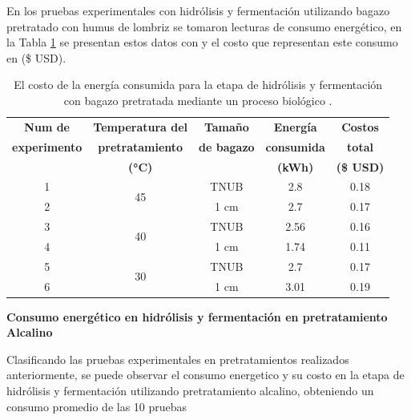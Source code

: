 \documentclass[12pt]{article}
\begin{document}
	En los pruebas experimentales con hidrólisis y fermentación utilizando bagazo pretratado con humus de lombriz se tomaron lecturas de consumo energético, en la Tabla \ref{pruebbio} se presentan estos datos con y el costo que representan este consumo en (\$ USD).
	

	\begin{table}[H]
	\centering
	\caption{El costo de la energía consumida para la etapa de hidrólisis y fermentación con bagazo pretratada mediante un proceso biológico . }
	\label{pruebbio}
	{\fontsize{9}{10.8}\selectfont %
		\begin{tabular}{|c|c|c|c|c|}
			\hline
			\textbf{Num de}&\textbf{Temperatura del} & \textbf{Tamaño } & \textbf{Energía } & \textbf{Costos } \\ 
		\textbf{experimento}&\textbf{pretratamiento} &	\textbf{ de bagazo}   & 	\textbf{consumida  }& 	\textbf{ total} \\ 
		&	\textbf{(°C)}  &    & \textbf{(kWh)} & \textbf{(\$ USD)} \\ \hline
	1	&	\multirow{2}{*}{45}& TNUB & 2.8 & 0.18 \\  \cline{3-5} \cline{1-1}
	2	&	& 1 cm & 2.7 & 0.17  \\ \hline 
	3	&	\multirow{2}{*}{40} & TNUB & 2.56 & 0.16  \\ \cline{3-5}\cline{1-1}
	4	&	& 1 cm & 1.74 & 0.11  \\ \hline
	5	&	\multirow{2}{*}{30}	& TNUB & 2.7 & 0.17  \\ \cline{3-5}\cline{1-1}
	6	&	& 1 cm & 3.01 & 0.19  \\ \hline
			
		\end{tabular}
	}
\end{table}




	
		\textbf{ Consumo energético en hidrólisis y fermentación en pretratamiento Alcalino }
	
	Clasificando las pruebas experimentales en pretratamientos realizados anteriormente, se puede observar el consumo energetico y su costo en la etapa de hidrólisis y fermentación utilizando pretratamiento alcalino, obteniendo un consumo promedio de las 10 pruebas
	
\end{document}
